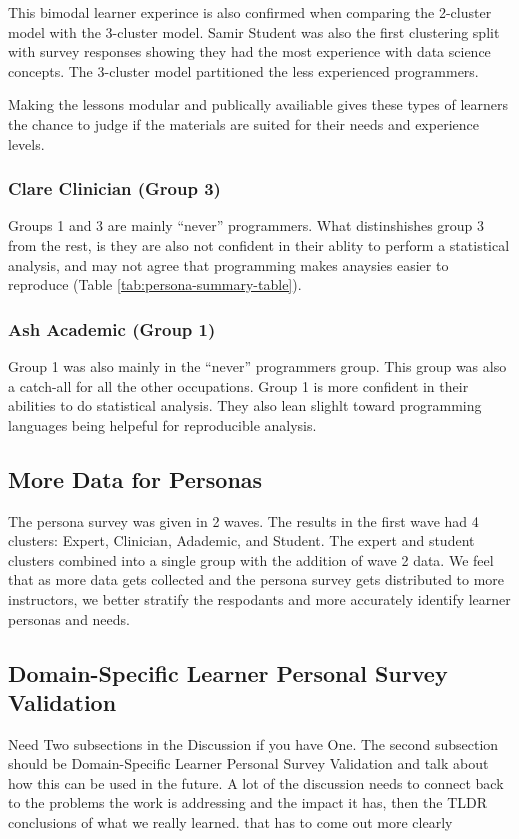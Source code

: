 \documentclass[020-persona\_validation.tex]{subfiles}
\begin{document}
            This bimodal learner experince is also confirmed when comparing the
            2-cluster model with the 3-cluster model. %
            Samir Student was also the first clustering split with survey responses showing
            they had the most experience with data science concepts.
            The 3-cluster model partitioned the less experienced programmers.

            Making the lessons modular and publically availiable
            gives these types of learners the chance to judge if the materials are suited for their needs
            and experience levels.

        \subsubsection{Clare Clinician (Group 3)}

            Groups 1 and 3 are mainly ``never'' programmers.
            What distinshishes group 3 from the rest, is they are also not confident in
            their ablity to perform a statistical analysis,
            and may not agree that programming makes anaysies easier to reproduce (Table \ref{tab:persona-summary-table}).

        \subsubsection{Ash Academic (Group 1)}

            Group 1 was also mainly in the ``never'' programmers group.
            This group was also a catch-all for all the other occupations.
            Group 1 is more confident in their abilities to do statistical analysis.
            They also lean slighlt toward programming languages being helpeful for reproducible analysis.

    \subsection{More Data for Personas}

        The persona survey was given in 2 waves.
        The results in the first wave had 4 clusters: Expert, Clinician, Adademic, and Student.
        The expert and student clusters combined into a single group with the addition of wave 2 data.
        We feel that as more data gets collected and the persona survey gets distributed to more
        instructors, we better stratify the respodants and more accurately identify learner personas and
        needs.

    \subsection{Domain-Specific Learner Personal Survey Validation}

    Need Two subsections in the Discussion if you have One. The second subsection should be Domain-Specific Learner Personal Survey Validation and talk about how this can be used in the future. A lot of the discussion needs to connect back to the problems the work is addressing and the impact it has, then the TLDR conclusions of what we really learned. that has to come out more clearly
    
\end{document}
